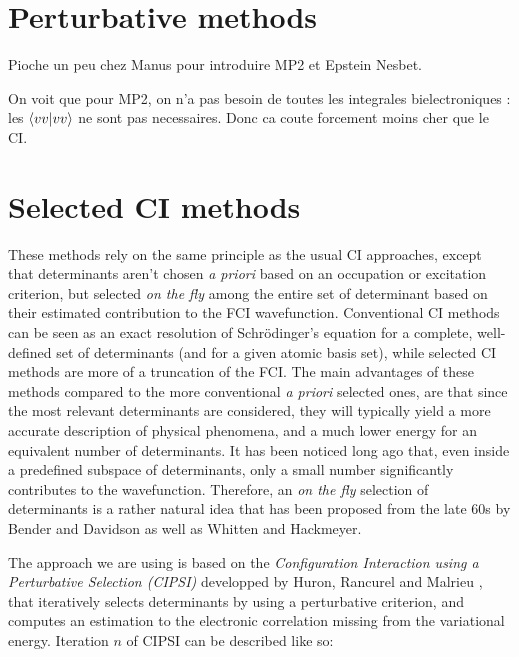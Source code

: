 \documentclass[./thesis.tex]{subfiles}
\begin{document}
\section{Perturbative methods}


\alert{Pioche un peu chez Manus pour introduire MP2 et Epstein Nesbet.}



\alert{On voit que pour MP2, on n'a pas besoin de toutes les integrales
bielectroniques : les $\braket{vv}{vv}$ ne sont pas necessaires. Donc ca coute
forcement moins cher que le CI.}

\section{Selected CI methods}

These methods rely on the same principle as the usual CI approaches, except that determinants aren't chosen \textit{a priori} based on an occupation or excitation criterion, but selected \emph{on the fly} among the entire set of determinant based on their estimated contribution to the FCI wavefunction. Conventional CI methods can be seen as an exact resolution of Schrödinger's equation for a complete, well-defined set of determinants (and for a given atomic basis set), while selected CI methods are more of a truncation of the FCI.
The main advantages of these methods compared to the more conventional \textit{a priori} selected ones, are that since the most relevant determinants are considered, they will typically yield a more accurate description of physical phenomena, and a much lower energy for an equivalent number of determinants.
It has been noticed long ago that, even inside a predefined subspace of determinants, only a small number significantly contributes to the wavefunction. Therefore, an \emph{on the fly} selection of determinants is a rather natural idea that has been proposed from the late 60s by Bender and Davidson\cite{Bender_1969} as well as Whitten and Hackmeyer\cite{Whitten_1969}.

The approach we are using is based on the \emph{Configuration Interaction using a Perturbative Selection (CIPSI)} developped by Huron, Rancurel and Malrieu \cite{Huron_1973}, that iteratively selects determinants by using a perturbative criterion, and computes an estimation to the electronic correlation missing from the variational energy.
Iteration $n$ of CIPSI can be described like so:
\end{document}
